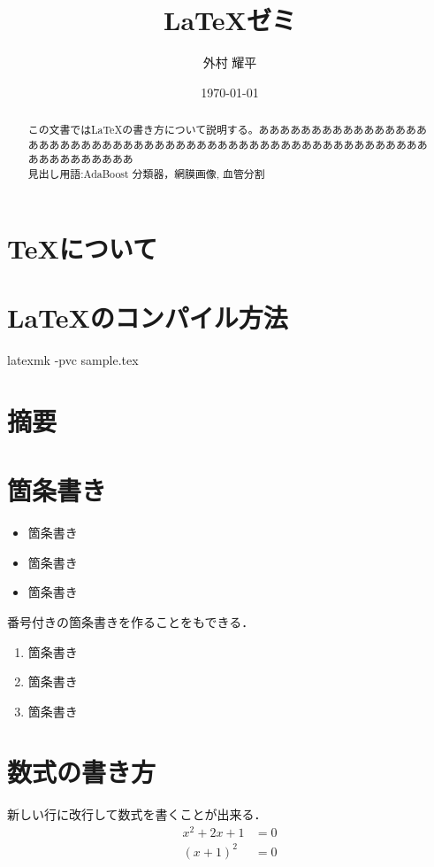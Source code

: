\documentclass[uplatex,11pt,a4j]{jsarticle}
\title{LaTeXゼミ}
\author{外村 耀平}
\date{\today}
\begin{document}
\maketitle

\section{TeXについて}

\section{LaTeXのコンパイル方法}

latexmk -pvc sample.tex

\section{摘要}
\begin{abstract}
この文書ではLaTeXの書き方について説明する。ああああああああああああああああああああああああああああああああああああああああああああああああああああああああああああああああ
\\
\noindent
見出し用語:AdaBoost 分類器，網膜画像, 血管分割
\end{abstract}


\section{箇条書き}

\begin{itemize}
\item 箇条書き
\item 箇条書き
\item 箇条書き
\end{itemize}

番号付きの箇条書きを作ることをもできる．
\begin{enumerate}
\item 箇条書き
\item 箇条書き
\item 箇条書き
\end{enumerate}

\section{数式の書き方}
新しい行に改行して数式を書くことが出来る．
\begin{align}
x^2 + 2x + 1 &= 0 \\
(x + 1)^2 &= 0
\end{align}
\end{document}
